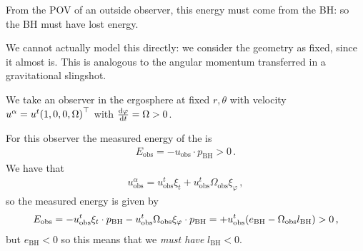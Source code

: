 \documentclass[main.tex]{subfiles}
\begin{document}
From the POV of an outside observer, this energy must come from the BH: so the BH must have lost energy. 

We cannot actually model this directly: we consider the geometry as fixed, since it almost is. 
This is analogous to the angular momentum transferred in a gravitational slingshot. 

We take an observer in the ergosphere at fixed \(r, \theta \) with velocity \(u^{\alpha } = u^{t}\qty(1, 0, 0, \Omega )^{\top}\) with \(\dv{\varphi }{t }= \Omega >0\). 


For this observer the measured energy of the is 
%
\begin{align}
  E _{\text{obs}} = - u _{\text{obs}} \cdot p _{\text{BH}}>0
\,.
\end{align}
%
We have that 
%
\begin{align}
  u^{\alpha } _{\text{obs}} = u^{t} _{\text{obs}} \xi_{t} + u^{t} _{\text{obs}} \Omega _{\text{obs}} \xi_{\varphi }
\,,
\end{align}
%
so the measured energy is given by 
%
\begin{align}
E _{\text{obs}} = - u^{t} _{\text{obs}} \xi_{t} \cdot p _{\text{BH}} - u^{t} _{\text{obs}} \Omega _{\text{obs}} \xi_{\varphi } \cdot p _{\text{BH}} 
= + u^{t} _{\text{obs}} \qty( e _{\text{BH}}  - \Omega _{\text{obs}} l _{\text{BH}} )
> 0 
\,,
\end{align}
%
but \(e _{\text{BH}} <0\) so this means that we \emph{must have} \(l _{\text{BH}}<0\). 
\end{document}
